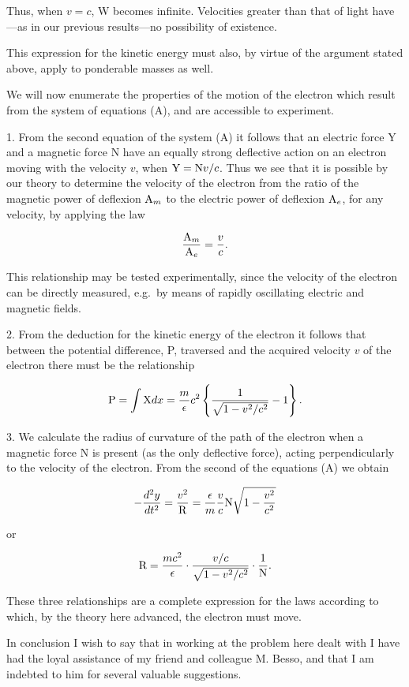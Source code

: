 \documentclass{article}
\begin{document}
Thus, when $v=c$, W becomes infinite.  Velocities
greater than that of light have---as in our previous results---no
possibility of existence.

This expression for the kinetic energy must also, by virtue of the
argument stated above, apply to ponderable masses as well.

We will now enumerate the properties of the motion of the electron
which result from the system of equations (A), and are accessible to
experiment.

1.  From the second equation of the system (A) it follows that an
electric force Y and a magnetic force N have an equally strong
deflective action on an electron moving with the velocity $v$, when
${\rm Y}={\rm N}v/c$.
Thus we see that it is possible by our theory to determine the
velocity of the electron from the ratio of the magnetic power of
deflexion ${\rm A}_m$ to the electric power of deflexion
${\rm A}_e$, for any velocity,
by applying the law

\[
\frac{{\rm A}_m}{{\rm A}_e}=\frac{v}{c}.
\]

This relationship may be tested experimentally, since the velocity of
the electron can be directly measured, e.g.\ by means of rapidly
oscillating electric and magnetic fields.

2.  From the deduction for the kinetic energy of the electron it
follows that between the potential difference, P, traversed and the
acquired velocity $v$ of the electron there must be the relationship

\[
{\rm P}=\int {\rm X}dx = \frac{m}{\epsilon}c^2\left\{\frac{1}{\sqrt{1-v^2/c^2}}-1\right\}.
\]

3.  We calculate the radius of curvature of the path of the electron
when a magnetic force N is present (as the only deflective force),
acting perpendicularly to the velocity of the electron.  From the
second of the equations (A) we obtain

\[
-\frac{d^2y}{dt^2}=\frac{v^2}{\rm R}=\frac{\epsilon}{m}\frac{v}{c}{\rm N}\sqrt{1-\frac{v^2}{c^2}}
\]

\noindent
or

\[
{\rm R} = \frac{mc^2}{\epsilon}\cdot\frac{v/c}{\sqrt{1-v^2/c^2}}\cdot\frac{1}{\rm N}.
\]

These three relationships are a complete expression for the laws
according to which, by the theory here advanced, the electron must
move.

In conclusion I wish to say that in working at the problem here dealt
with I have had the loyal assistance of my friend and colleague M.
Besso, and that I am indebted to him for several valuable suggestions.
\end{document}
